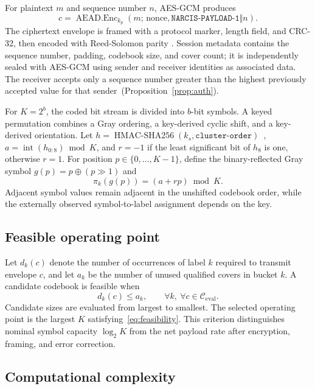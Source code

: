 \documentclass[10pt,journal]{IEEEtran}
\begin{document}
For plaintext $m$ and sequence number $n$, AES-GCM produces
\begin{equation}
c=\operatorname{AEAD.Enc}_{k_p}(m;\,\mathrm{nonce},
\texttt{NARCIS-PAYLOAD-1}\Vert n).
\end{equation}
The ciphertext envelope is framed with a protocol marker, length field,
and CRC-32, then encoded with Reed-Solomon parity
\cite{reed1960polynomial}. Session metadata contains the sequence
number, padding, codebook size, and cover count; it is independently
sealed with AES-GCM using sender and receiver identities as associated
data. The receiver accepts only a sequence number greater than the
highest previously accepted value for that sender~(Proposition~\ref{prop:auth}).

For $K=2^b$, the coded bit stream is divided into $b$-bit symbols. A
keyed permutation combines a Gray ordering, a key-derived cyclic shift,
and a key-derived orientation. Let
$h=\operatorname{HMAC\text{-}SHA256}(k_s,\texttt{cluster-order})$~\cite{nist2008hmac},
$a=\operatorname{int}(h_{0:8})\bmod K$, and $r{=}{-1}$ if the least
significant bit of $h_8$ is one, otherwise $r{=}1$. For position
$p\in\{0,\ldots,K-1\}$, define the binary-reflected Gray symbol
$g(p)=p\oplus(p\!\gg\!1)$ and
\begin{equation}
\pi_k(g(p))=(a+rp)\bmod K.
\label{eq:keyedgray}
\end{equation}
Adjacent symbol values remain adjacent in the unshifted codebook order,
while the externally observed symbol-to-label assignment depends on the
key.

\subsection{Feasible operating point}

Let $d_k(c)$ denote the number of occurrences of label $k$ required
to transmit envelope $c$, and let $a_k$ be the number of unused
qualified covers in bucket $k$. A candidate codebook is feasible when
\begin{equation}
d_k(c)\leq a_k,\qquad
\forall k,\ \forall c\in\mathcal{C}_{\mathrm{eval}}.
\label{eq:feasibility}
\end{equation}
Candidate sizes are evaluated from largest to smallest. The selected
operating point is the largest $K$ satisfying~\eqref{eq:feasibility}.
This criterion distinguishes nominal symbol capacity $\log_2 K$ from
the net payload rate after encryption, framing, and error correction.

\subsection{Computational complexity}
\end{document}
